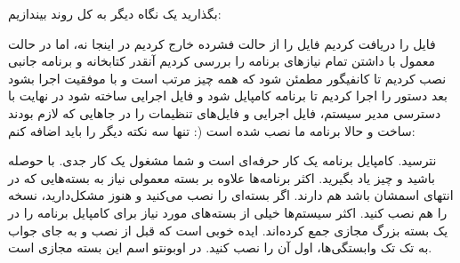 بگذارید یک نگاه دیگر به کل روند بیندازیم:

فایل را دریافت کردیم
فایل را از حالت فشرده خارج کردیم
در اینجا نه، اما در حالت معمول با 
 داشتن تمام نیازهای برنامه را بررسی کردیم
آنقدر کتابخانه و برنامه جانبی نصب کردیم تا کانفیگور مطمئن شود که همه چیز مرتب است و با موفقیت اجرا بشود
بعد دستور 
 را اجرا کردیم تا برنامه کامپایل شود و فایل اجرایی ساخته شود
در نهایت 
 با دسترسی مدیر سیستم، فایل اجرایی و فایل‌های تنظیمات را در جاهایی که لازم بودند ساخت
و حالا برنامه ما نصب شده است (: تنها سه نکته دیگر را باید اضافه کنم:

نترسید. کامپایل برنامه یک کار حرفه‌ای است و شما مشغول یک کار جدی. با حوصله باشید و چیز یاد بگیرید.
اکثر برنامه‌ها علاوه بر بسته معمولی نیاز به بسته‌هایی که در انتهای اسمشان 
 باشد هم دارند. اگر بسته‌ای را نصب می‌کنید و هنوز مشکل‌دارید، نسخه 
 را هم نصب کنید.
اکثر سیستم‌ها خیلی از بسته‌های مورد نیاز برای کامپایل برنامه را در یک بسته بزرگ مجازی جمع کرده‌اند. ایده خوبی است که قبل از نصب و به جای جواب به تک تک وابستگی‌ها، اول آن را نصب کنید. در اوبونتو اسم این بسته مجازی 
 است.
